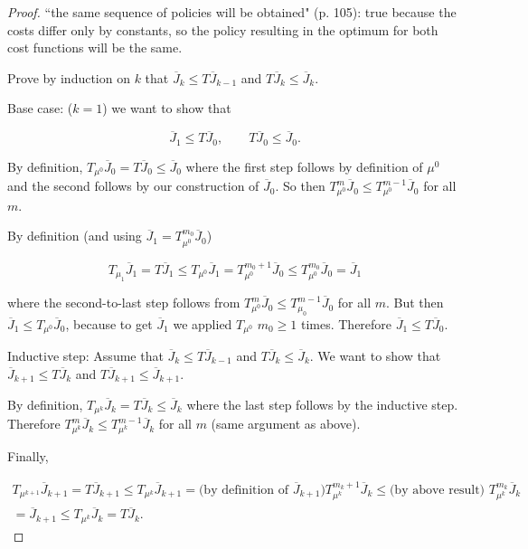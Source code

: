 \begin{enumerate}
\begin{proof}

``the same sequence of policies will be obtained" (p. 105): true because the costs differ only by constants, so the policy resulting in the optimum for both cost functions will be the same.

Prove by induction on \(k\) that \(\overline{J}_k \leq T \overline{J}_{k-1}\) and \(T \overline{J}_k \leq \overline{J}_k\). 

Base case: (\(k=1\)) we want to show that 

\[
\overline{J}_1 \leq T \overline{J}_0 , \qquad T \overline{J}_0 \leq \overline{J}_0.
\]

By definition, \(T_{\mu^0}\overline{J}_0 = T \overline{J}_0 \leq \overline{J}_0\) where the first step follows by definition of \(\mu^0\) and the second follows by our construction of \(\overline{J}_0\). So then \(T_{\mu^0}^m \overline{J}_0 \leq T_{\mu^0}^{m-1} \overline{J}_0 \) for all \(m\).

By definition (and using \(\overline{J}_1 = T_{\mu^0}^{m_0} \overline{J}_0\))

\[
T_{\mu_1} \overline{J}_1 = T \overline{J}_1 \leq T_{\mu^0} \overline{J}_1 = T_{\mu^0}^{m_0 + 1} \overline{J}_0 \leq T_{\mu^0}^{m_0} \overline{J}_0 = \overline{J}_1
\] 

where the second-to-last step follows from \(T_{\mu^0}^m \overline{J}_0 \leq T_{\mu_0}^{m-1} \overline{J}_0\) for all \(m\). But then \(\overline{J}_1 \leq T_{\mu^0}\overline{J}_0\), because to get \(\overline{J}_1\) we applied \(T_{\mu^0}\) \(m_0 \geq 1\) times. Therefore \(\overline{J}_1 \leq T \overline{J}_0\). 

Inductive step: Assume that \(\overline{J}_k \leq T \overline{J}_{k-1}\) and \(T \overline{J}_k \leq \overline{J}_k\). We want to show that \(\overline{J}_{k+1} \leq T \overline{J}_k\) and \(T \overline{J}_{k+1} \leq \overline{J}_{k+1}\).

By definition, \(T_{\mu^k} \overline{J}_k = T \overline{J}_k \leq \overline{J}_k\) where the last step follows by the inductive step. Therefore \(T_{\mu^k}^m \overline{J}_k \leq T_{\mu^k}^{m-1} \overline{J}_k\) for all \(m\) (same argument as above).

Finally, 

\begin{multline*}
T_{\mu^{k+1}} \overline{J}_{k+1} = T \overline{J}_{k+1} \leq T_{\mu^k}\overline{J}_{k+1} = \text{(by definition of \(\overline{J}_{k+1}\))} T_{\mu^k}^{m_k +1} \overline{J}_k \leq \text{(by above result) } T_{\mu^k}^{m_k} \overline{J}_k 
\\ = \overline{J}_{k+1} \leq T_{\mu^k}\overline{J}_k = T \overline{J}_k.
\end{multline*}


\end{proof}
\end{enumerate}
